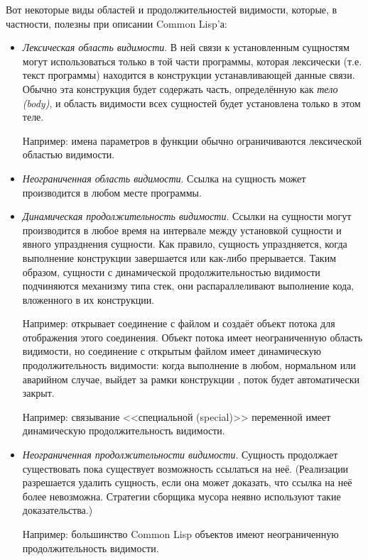 Вот некоторые виды областей и продолжительностей видимости, которые, в частности,
полезны при описании Common Lisp'а:
\begin{itemize}
\item 
\emph{Лексическая область видимости}. В ней связи к установленным сущностям могут
использоваться только в той части программы, которая лексически (т.е. текст
программы) находится в конструкции устанавливающей данные связи. Обычно эта
конструкция будет содержать часть, определённую как \emph{тело (body)}, и область
видимости всех сущностей будет установлена только в этом теле.

Например: имена параметров в функции обычно ограничиваются лексической областью
видимости.

\item
\emph{Неограниченная область видимости}. Ссылка на сущность может производится в
любом месте программы.

\item
\emph{Динамическая продолжительность видимости}. Ссылки на сущности могут
производится в любое время на интервале между установкой сущности и явного
упразднения сущности. Как правило, сущность упраздняется, когда выполнение конструкции
завершается или как-либо прерывается. Таким образом, сущности с динамической
продолжительностью видимости подчиняются механизму типа стек, они распараллеливают
выполнение кода, вложенного в их конструкции.

Например:  открывает соединение с файлом и создаёт объект
потока для отображения этого соединения. Объект потока имеет неограниченную область
видимости, но соединение с открытым файлом имеет динамическую продолжительность
видимости: когда выполнение в любом, нормальном или аварийном случае, выйдет за
рамки конструкции , поток будет автоматически закрыт.

Например: связывание <<специальной (special)>> переменной имеет динамическую
продолжительность видимости.

\item
\emph{Неограниченная продолжительности видимости}. Сущность продолжает существовать
пока существует возможность ссылаться на неё. (Реализации разрешается удалить
сущность, если она может доказать, что ссылка на неё более невозможна. Стратегии
сборщика мусора неявно используют такие доказательства.)

Например: большинство Common Lisp объектов имеют неограниченную продолжительность
видимости.


\end{itemize}
